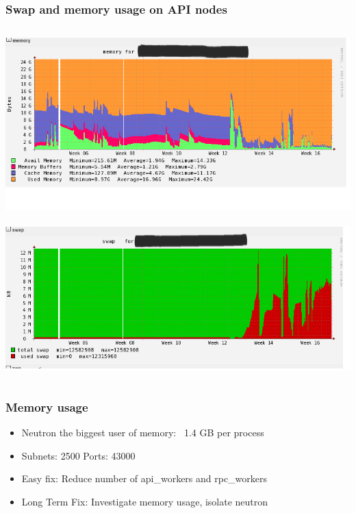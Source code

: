 \documentclass[aspectratio=169,11pt,hyperref={colorlinks=true}]{beamer}
\begin{document}
\begin{frame}
    \frametitle{Swap and memory usage on API nodes}
    \begin{columns}[t]
    \centering
        \includegraphics[scale=0.30]{logos/mem_api.png}\ \includegraphics[scale=0.30]{logos/swap_api.png}
    \end{columns}
\end{frame}

\begin{frame}
    \frametitle{Memory usage}
    \begin{itemize}[<+-| alert@+>]
        \item Neutron the biggest user of memory: ~1.4 GB per process
        \item Subnets: 2500 Ports: 43000
        \item Easy fix: Reduce  number of api\_workers and rpc\_workers
        \item Long Term Fix: Investigate memory usage, isolate neutron
    \end{itemize}
\end{frame}
\end{document}
